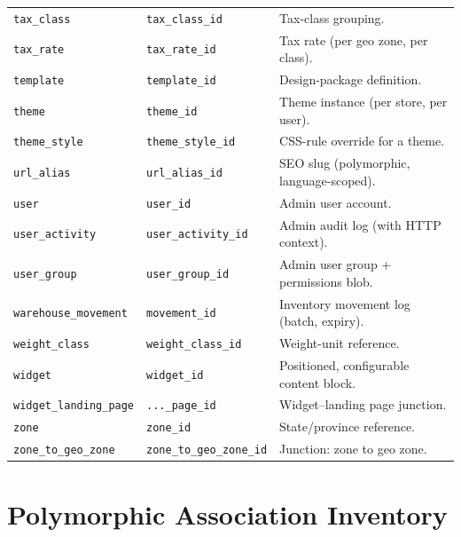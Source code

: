 \documentclass[11pt,a4paper]{article}
\begin{document}
\begin{longtable}{>{\raggedright\arraybackslash}p{4.7cm}>{\raggedright\arraybackslash}p{3.4cm}>{\raggedright\arraybackslash}p{6.3cm}}
\texttt{tax\_class}              & \texttt{tax\_class\_id}     & Tax-class grouping. \\
\texttt{tax\_rate}               & \texttt{tax\_rate\_id}      & Tax rate (per geo zone, per class). \\
\texttt{template}                & \texttt{template\_id}       & Design-package definition. \\
\texttt{theme}                   & \texttt{theme\_id}          & Theme instance (per store, per user). \\
\texttt{theme\_style}            & \texttt{theme\_style\_id}   & CSS-rule override for a theme. \\
\texttt{url\_alias}              & \texttt{url\_alias\_id}     & SEO slug (polymorphic, language-scoped). \\
\texttt{user}                    & \texttt{user\_id}           & Admin user account. \\
\texttt{user\_activity}          & \texttt{user\_activity\_id} & Admin audit log (with HTTP context). \\
\texttt{user\_group}             & \texttt{user\_group\_id}    & Admin user group + permissions blob. \\
\texttt{warehouse\_movement}     & \texttt{movement\_id}       & Inventory movement log (batch, expiry). \\
\texttt{weight\_class}           & \texttt{weight\_class\_id}  & Weight-unit reference. \\
\texttt{widget}                  & \texttt{widget\_id}         & Positioned, configurable content block. \\
\texttt{widget\_landing\_page}   & \texttt{...\_page\_id} & Widget--landing page junction. \\
\texttt{zone}                    & \texttt{zone\_id}           & State/province reference. \\
\texttt{zone\_to\_geo\_zone}     & \texttt{zone\_to\_geo\_zone\_id} & Junction: zone to geo zone. \\
\end{longtable}

\section{Polymorphic Association Inventory}\label{app:polymorphic}
\end{document}
